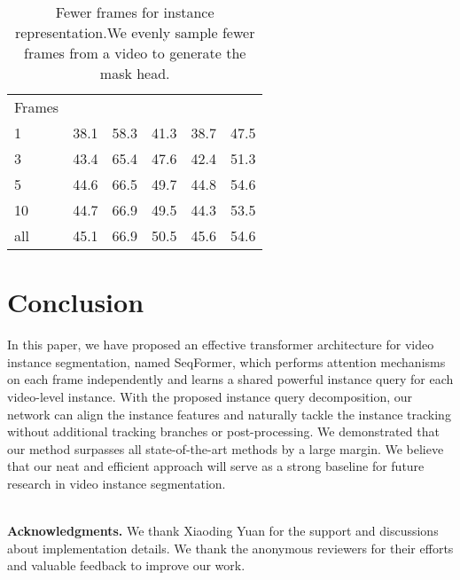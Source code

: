 \documentclass[runningheads]{llncs}
\begin{document}
\setlength{\tabcolsep}{4pt}
\begin{table}[tb]
\begin{center}
\caption{Fewer frames for instance representation.We evenly sample fewer frames from a video to generate the mask head.}
\label{reduce_frames}
\begin{tabular}{lccccc}
\hline\noalign{\smallskip}
Frames    &    &  & &  &  \\
\noalign{\smallskip}
\hline
\noalign{\smallskip}
1  &38.1  &58.3  &41.3  &38.7  &47.5   \\
3   &43.4  &65.4  &47.6  &42.4  &51.3  \\
5   &44.6  &66.5  &49.7  &44.8  &54.6  \\
10   &44.7  &66.9  &49.5  &44.3  &53.5 \\
all  &45.1  &66.9  &50.5 &45.6 &54.6   \\
\hline
\end{tabular}
\end{center}
\end{table}
\setlength{\tabcolsep}{1.4pt}





\section{Conclusion}
In this paper, we have proposed an effective transformer architecture for video instance segmentation, named SeqFormer, which performs attention mechanisms on each frame independently and learns a shared powerful instance query for each video-level instance. With the proposed instance query decomposition, our network can align the instance features and naturally tackle the instance tracking without additional tracking branches or post-processing.
We demonstrated that our method surpasses all state-of-the-art methods by a large margin.  We believe that our  neat and efficient approach will serve as a strong baseline for future research in video instance segmentation.


~\\
\noindent\textbf{Acknowledgments.}
We thank Xiaoding Yuan for the support and discussions about implementation details.
We thank the anonymous reviewers for their efforts and valuable feedback to improve our work.












\end{document}
